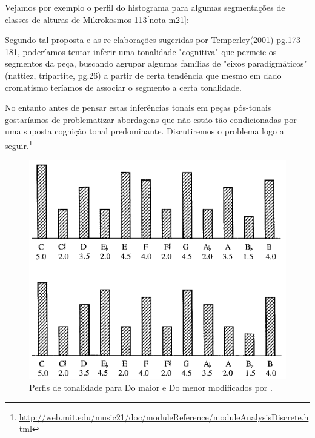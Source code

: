 \documentclass[
	12pt,				%
	openright,			%
	twoside,			%
	a4paper,			%
	english,			%
	french,				%
	spanish,			%
	brazil				%
	]{abntex2}
\begin{document}
Vejamos por exemplo o perfil do histograma para algumas segmentações de classes de alturas de Mikrokosmos 113[nota m21]:




Segundo tal proposta e as re-elaborações sugeridas por Temperley(2001) pg.173-181, poderíamos tentar inferir uma tonalidade "cognitiva" que permeie os segmentos da peça, buscando agrupar algumas famílias de "eixos paradigmáticos"(nattiez, tripartite, pg.26) a partir de certa tendência que mesmo em dado cromatismo teríamos de associar o segmento a certa tonalidade.

No entanto antes de pensar estas inferências tonais em peças pós-tonais gostaríamos de problematizar abordagens que não estão tão condicionadas por uma suposta cognição tonal predominante. Discutiremos o problema logo a seguir.\footnote{\url{http://web.mit.edu/music21/doc/moduleReference/moduleAnalysisDiscrete.html}} 


\begin{figure}[!h]
	\caption{\label{fig_grafico}Perfis de tonalidade para Do maior e Do menor modificados por . }
	\begin{center}
	    \includegraphics[scale=0.6]{CBMS/temperley_mod_keyprofile.png}
	\end{center}
\end{figure}
\end{document}
